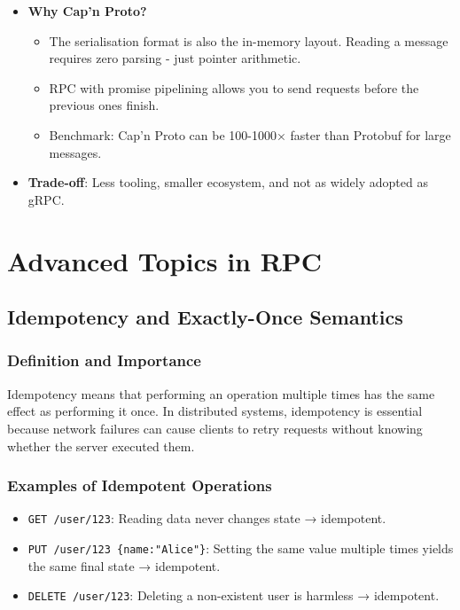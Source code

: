 \documentclass[10pt,a4paper]{article}
\begin{document}
\begin{itemize}
    \item \textbf{Why Cap’n Proto?}
        \begin{itemize}
            \item The serialisation format is also the in-memory layout. Reading a message requires zero parsing - just pointer arithmetic.
            \item RPC with promise pipelining allows you to send requests before the previous ones finish.
            \item Benchmark: Cap’n Proto can be 100-1000× faster than Protobuf for large messages.
        \end{itemize}
    \item \textbf{Trade-off}: Less tooling, smaller ecosystem, and not as widely adopted as gRPC.
\end{itemize}

\section{Advanced Topics in RPC}

\subsection{Idempotency and Exactly-Once Semantics}

\subsubsection{Definition and Importance}
Idempotency means that performing an operation multiple times has the same effect as performing it once. In distributed systems, idempotency is essential because network failures can cause clients to retry requests without knowing whether the server executed them.

\subsubsection{Examples of Idempotent Operations}
\begin{itemize}
    \item \texttt{GET /user/123}: Reading data never changes state → idempotent.
    \item \texttt{PUT /user/123 \{name:"Alice"\}}: Setting the same value multiple times yields the same final state → idempotent.
    \item \texttt{DELETE /user/123}: Deleting a non-existent user is harmless → idempotent.
\end{itemize}
\end{document}
